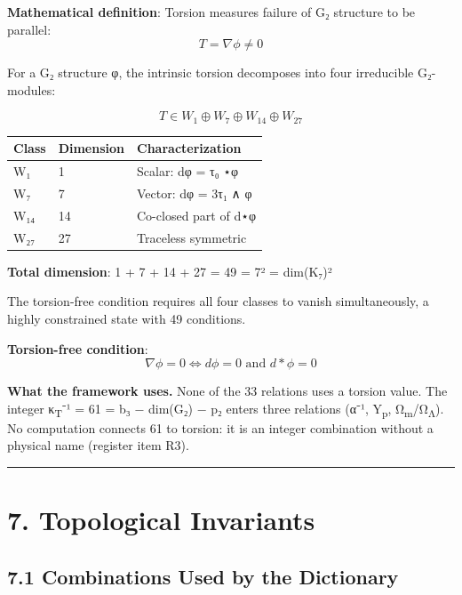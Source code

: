 \documentclass[11pt,a4paper]{article}
\begin{document}
\textbf{Mathematical definition}: Torsion measures failure of G₂ structure to be parallel: \[T = \nabla\phi \neq 0\]

For a G₂ structure φ, the intrinsic torsion decomposes into four irreducible G₂-modules:

\[T \in W_1 \oplus W_7 \oplus W_{14} \oplus W_{27}\]

\begin{longtable}[]{@{}lll@{}}
\toprule\noalign{}
Class & Dimension & Characterization \\
\midrule\noalign{}
\endhead
\bottomrule\noalign{}
\endlastfoot
W₁ & 1 & Scalar: dφ = τ₀ ⋆φ \\
W₇ & 7 & Vector: dφ = 3τ₁ ∧ φ \\
W₁₄ & 14 & Co-closed part of d⋆φ \\
W₂₇ & 27 & Traceless symmetric \\
\end{longtable}

\textbf{Total dimension}: 1 + 7 + 14 + 27 = 49 = 7² = dim(K₇)²

The torsion-free condition requires all four classes to vanish simultaneously, a highly constrained state with 49 conditions.

\textbf{Torsion-free condition}: \[\nabla\phi = 0 \Leftrightarrow d\phi = 0 \text{ and } d*\phi = 0\]

\textbf{What the framework uses.} None of the 33 relations uses a torsion value. The integer κ\textsubscript{T}⁻¹ = 61 = b₃ − dim(G₂) − p₂ enters three relations (α⁻¹, Y\textsubscript{p}, Ω\textsubscript{m}/Ω\textsubscript{Λ}). No computation connects 61 to torsion: it is an integer combination without a physical name (register item R3).

\begin{center}\rule{\linewidth}{0.5pt}\end{center}

\section{7. Topological Invariants}\label{topological-invariants}

\subsection{7.1 Combinations Used by the Dictionary}\label{combinations-used-by-the-dictionary}
\end{document}
